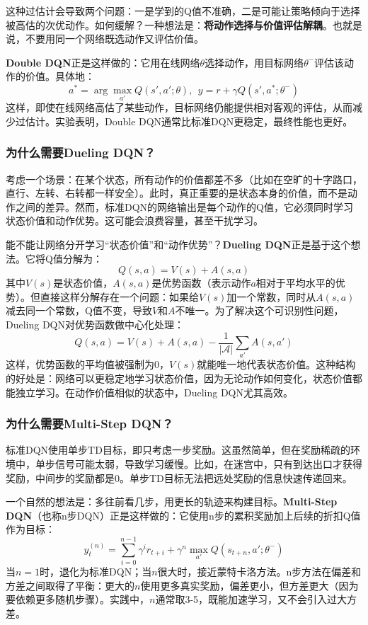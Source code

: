 \documentclass[lang=cn,zihao=-4,a4paper,fontset=windows]{beautybook}
\begin{document}
这种过估计会导致两个问题：一是学到的Q值不准确，二是可能让策略倾向于选择被高估的次优动作。如何缓解？一种想法是：\textbf{将动作选择与价值评估解耦}。也就是说，不要用同一个网络既选动作又评估价值。

\textbf{Double DQN}正是这样做的：它用在线网络$\theta$选择动作，用目标网络$\theta^-$评估该动作的价值。具体地：
\[
a^* = \arg\max_{a'} Q(s', a'; \theta),~~y = r + \gamma Q(s', a^*; \theta^-)
\]
这样，即使在线网络高估了某些动作，目标网络仍能提供相对客观的评估，从而减少过估计。实验表明，Double DQN通常比标准DQN更稳定，最终性能也更好。

\subsubsection{为什么需要Dueling DQN？}

考虑一个场景：在某个状态，所有动作的价值都差不多（比如在空旷的十字路口，直行、左转、右转都一样安全）。此时，真正重要的是状态本身的价值，而不是动作之间的差异。然而，标准DQN的网络输出是每个动作的Q值，它必须同时学习状态价值和动作优势。这可能会浪费容量，甚至干扰学习。

能不能让网络分开学习“状态价值”和“动作优势”？\textbf{Dueling DQN}正是基于这个想法。它将Q值分解为：
\[
Q(s, a) = V(s) + A(s, a)
\]
其中$V(s)$是状态价值，$A(s, a)$是优势函数（表示动作$a$相对于平均水平的优势）。但直接这样分解存在一个问题：如果给$V(s)$加一个常数，同时从$A(s, a)$减去同一个常数，Q值不变，导致$V$和$A$不唯一。为了解决这个可识别性问题，Dueling DQN对优势函数做中心化处理：
\[
Q(s, a) = V(s) + A(s, a) - \frac{1}{|\mathcal{A}|} \sum_{a'} A(s, a')
\]
这样，优势函数的平均值被强制为0，$V(s)$就能唯一地代表状态价值。这种结构的好处是：网络可以更稳定地学习状态价值，因为无论动作如何变化，状态价值都能独立学习。在动作价值相似的状态中，Dueling DQN尤其高效。

\subsubsection{为什么需要Multi-Step DQN？}

标准DQN使用单步TD目标，即只考虑一步奖励。这虽然简单，但在奖励稀疏的环境中，单步信号可能太弱，导致学习缓慢。比如，在迷宫中，只有到达出口才获得奖励，中间步的奖励都是0。单步TD目标无法把远处奖励的信息快速传递回来。

一个自然的想法是：多往前看几步，用更长的轨迹来构建目标。\textbf{Multi-Step DQN}（也称n步DQN）正是这样做的：它使用n步的累积奖励加上后续的折扣Q值作为目标：
\[
y_t^{(n)} = \sum_{i=0}^{n-1} \gamma^i r_{t+i} + \gamma^n \max_{a'} Q(s_{t+n}, a'; \theta^-)
\]
当$n=1$时，退化为标准DQN；当$n$很大时，接近蒙特卡洛方法。n步方法在偏差和方差之间取得了平衡：更大的$n$使用更多真实奖励，偏差更小，但方差更大（因为要依赖更多随机步骤）。实践中，$n$通常取3-5，既能加速学习，又不会引入过大方差。
\end{document}
